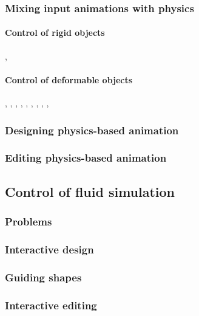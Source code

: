 \subsubsection{Mixing input animations with physics}

\paragraph{Control of rigid objects}
\cite{Popovic2000}, \cite{Popovic2003}

\paragraph{Control of deformable objects}
\cite{Kondo2005}, \cite{Bergou2007}, \cite{Martin2011}, \cite{Barbic2012}, \cite{Coros2012}, \cite{Hahn2012}, \cite{Hildebrandt2012}, \cite{Hahn2013}, \cite{Liu2013}, \cite{Li2014}

\subsubsection{Designing physics-based animation}

\subsubsection{Editing physics-based animation}
\cite{Pighin2004}

\subsection{Control of fluid simulation}

\subsubsection{Problems}

\subsubsection{Interactive design}

\subsubsection{Guiding shapes}

\subsubsection{Interactive editing}

